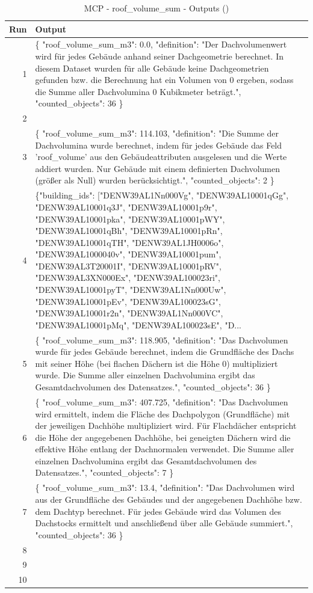 \documentclass[a4paper,11pt]{article}
\begin{document}
\begin{table}[ht]
\centering
\scriptsize
\caption{MCP - roof\_volume\_sum - Outputs ()}
\label{tab:mcp\_roof\_volume\_sum\_outputs\_}
\begin{tabular}{r p{12cm}}
\hline
Run & Output \\
\hline
1 & \{
  "roof\_volume\_sum\_m3": 0.0,
  "definition": "Der Dachvolumenwert wird für jedes Gebäude anhand seiner Dachgeometrie berechnet. In diesem Dataset wurden für alle Gebäude keine Dachgeometrien gefunden bzw. die Berechnung hat ein Volumen von 0 ergeben, sodass die Summe aller Dachvolumina 0 Kubikmeter beträgt.",
  "counted\_objects": 36
\} \\
2 &  \\
3 & \{
  "roof\_volume\_sum\_m3": 114.103,
  "definition": "Die Summe der Dachvolumina wurde berechnet, indem für jedes Gebäude das Feld 'roof\_volume' aus den Gebäudeattributen ausgelesen und die Werte addiert wurden. Nur Gebäude mit einem definierten Dachvolumen (größer als Null) wurden berücksichtigt.",
  "counted\_objects": 2
\} \\
4 & \{"building\_ids": ["DENW39AL1Nn000Vg", "DENW39AL10001qGg", "DENW39AL10001q3J", "DENW39AL10001p9r", "DENW39AL10001pka", "DENW39AL10001pWY", "DENW39AL10001qBh", "DENW39AL10001pRn", "DENW39AL10001qTH", "DENW39AL1JH0006o", "DENW39AL1000040v", "DENW39AL10001pum", "DENW39AL3T20001I", "DENW39AL10001pRV", "DENW39AL3XN000Ex", "DENW39AL100023ri", "DENW39AL10001pyT", "DENW39AL1Nn000Uw", "DENW39AL10001pEv", "DENW39AL100023sG", "DENW39AL10001r2n", "DENW39AL1Nn000VC", "DENW39AL10001pMq", "DENW39AL100023sE", "D... \\
5 & \{
  "roof\_volume\_sum\_m3": 118.905,
  "definition": "Das Dachvolumen wurde für jedes Gebäude berechnet, indem die Grundfläche des Dachs mit seiner Höhe (bei flachen Dächern ist die Höhe 0) multipliziert wurde. Die Summe aller einzelnen Dachvolumina ergibt das Gesamtdachvolumen des Datensatzes.",
  "counted\_objects": 36
\} \\
6 & \{
  "roof\_volume\_sum\_m3": 407.725,
  "definition": "Das Dachvolumen wird ermittelt, indem die Fläche des Dachpolygon (Grundfläche) mit der jeweiligen Dachhöhe multipliziert wird. Für Flachdächer entspricht die Höhe der angegebenen Dachhöhe, bei geneigten Dächern wird die effektive Höhe entlang der Dachnormalen verwendet. Die Summe aller einzelnen Dachvolumina ergibt das Gesamtdachvolumen des Datensatzes.",
  "counted\_objects": 7
\} \\
7 & \{
  "roof\_volume\_sum\_m3": 13.4,
  "definition": "Das Dachvolumen wird aus der Grundfläche des Gebäudes und der angegebenen Dachhöhe bzw. dem Dachtyp berechnet. Für jedes Gebäude wird das Volumen des Dachstocks ermittelt und anschließend über alle Gebäude summiert.",
  "counted\_objects": 36
\} \\
8 &  \\
9 &  \\
10 &  \\
\hline
\end{tabular}
\end{table}
\end{document}
